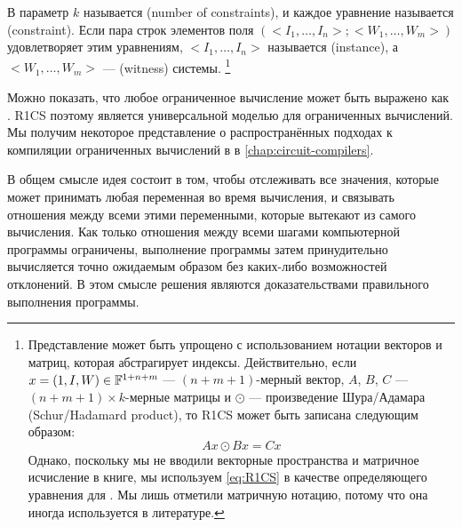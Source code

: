 В  параметр $k$ называется  (number of constraints), и каждое уравнение называется  (constraint). Если пара строк элементов поля $(<I_1,\ldots, I_n>; <W_1,\ldots,W_m>)$ удовлетворяет этим уравнениям, $<I_1,\ldots, I_n>$ называется  (instance), а $<W_1,\ldots,W_m>$ —  (witness) системы.%
\footnote{Представление  может быть упрощено с использованием нотации векторов и матриц, которая абстрагирует индексы. Действительно, если $x= (1,I,W)\in \mathbb{F}^{1+n+m}$ — $(n+m+1)$-мерный вектор, $A$, $B$, $C$ — $(n+m+1)\times k$-мерные матрицы и $\odot$ — произведение Шура/Адамара (Schur/Hadamard product), то R1CS может быть записана следующим образом:
$$
Ax \odot Bx = Cx
$$
Однако, поскольку мы не вводили векторные пространства и матричное исчисление в книге, мы используем \ref{eq:R1CS} в качестве определяющего уравнения для . Мы лишь отметили матричную нотацию, потому что она иногда используется в литературе.}

Можно показать, что любое ограниченное вычисление может быть выражено как . R1CS поэтому является универсальной моделью для ограниченных вычислений. Мы получим некоторое представление о распространённых подходах к компиляции ограниченных вычислений в  в \chaptname{} \ref{chap:circuit-compilers}. 

В общем смысле идея  состоит в том, чтобы отслеживать все значения, которые может принимать любая переменная во время вычисления, и связывать отношения между всеми этими переменными, которые вытекают из самого вычисления. Как только отношения между всеми шагами компьютерной программы ограничены, выполнение программы затем принудительно вычисляется точно ожидаемым образом без каких-либо возможностей отклонений. В этом смысле решения  являются доказательствами правильного выполнения программы.

